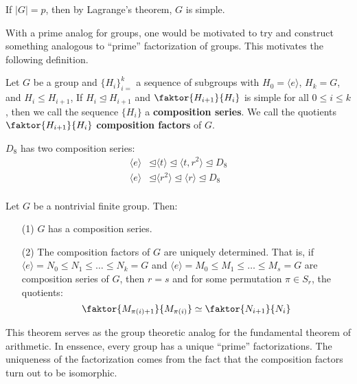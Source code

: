 \begin{example}\label{example_3.8}
  If $|G|=p$, then by Lagrange's theorem, $G$ is simple.
\end{example}

With a prime analog for groups, one would be motivated to try and construct
something analogous to ``prime'' factorization of groups. This motivates the
following definition.

\begin{definition}
  Let $G$ be a group and $\{H_i\}_{i=}^k$ a sequence of subgroups with
  $H_0=\langle e \rangle$, $H_k=G$, and  $H_i \leq H_{i+1}$, If $H_i \unlhd H_{i+1}$
  and $\faktor{H_{i+1}}{H_i}$ is simple for all $0 \leq i \leq k$, then we
  call the sequence  $\{H_i\}$ a \textbf{composition series}. We call the
  quotients $\faktor{H_{i+1}}{H_i}$ \textbf{composition factors} of $G$.
\end{definition}

\begin{example}\label{example_3.9}
  $D_8$ has two composition series:
  \begin{align*}
    \langle e \rangle & \unlhd \langle t \rangle \unlhd \langle t, r^2
    \rangle \unlhd D_8  \\
    \langle e \rangle & \unlhd \langle r^2 \rangle \unlhd \langle r
    \rangle \unlhd D_8  \\
  \end{align*}
\end{example}

\begin{theorem}\label{theorem_3.5.2}
  Let $G$ be a nontrivial finite group. Then:
  \begin{enumerate}
    \item[(1)] $G$ has a composition series.

    \item[(2)] The composition factors of  $G$ are uniquely determined. That
      is, if $\langle e \rangle=N_0 \leq N_1 \leq \dots \leq N_k=G$ and
      $\langle e \rangle=M_0 \leq M_1 \leq \dots \leq M_s=G$ are composition
      series of $G$, then  $r=s$ and for some permutation  $\pi \in S_r$,
      the quotients:
      \begin{equation*}
        \faktor{M_{\pi(i)+1}}{M_{\pi(i)}} \simeq \faktor{N_{i+1}}{N_i}
      \end{equation*}
  \end{enumerate}
\end{theorem}
\begin{remark}
  This theorem serves as the group theoretic analog for the fundamental theorem of
  arithmetic. In enssence, every group has a unique ``prime'' factorizations.
  The uniqueness of the factorization comes from the fact that the composition
  factors turn out to be isomorphic.
\end{remark}

